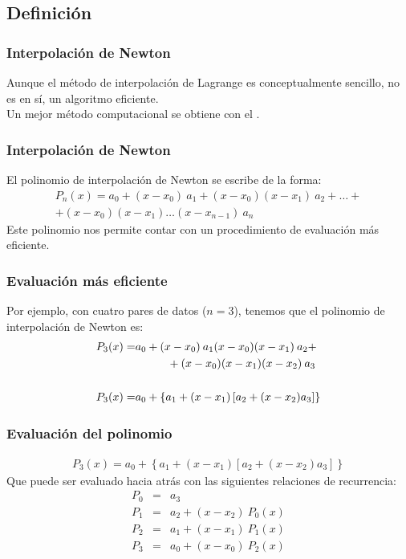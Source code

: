 \subsection{Definición}
\begin{frame}
\frametitle{Interpolación de Newton}
Aunque el método de interpolación de Lagrange es conceptualmente sencillo, no es en sí, un algoritmo eficiente.
\\
\medskip
Un mejor método computacional se obtiene con el .
\end{frame}
\begin{frame}
\frametitle{Interpolación de Newton}
El polinomio de interpolación de Newton se escribe de la forma:
\fontsize{12}{12}\selectfont
\[ \begin{split}
P_{n}(x) = a_{0} + (x - x_{0}) \: a_{1} + (x - x_{0})(x - x_{1}) \: a_{2} + \ldots + \\
+ (x - x_{0})(x - x_{1}) \ldots (x - x_{n - 1}) \: a_{n} 
\end{split} \]
\fontsize{14}{14}\selectfont
\pause
Este polinomio nos permite contar con un procedimiento de evaluación más eficiente.
\end{frame}
\begin{frame}
\frametitle{Evaluación más eficiente}
Por ejemplo, con cuatro pares de datos ($n = 3$), tenemos que el polinomio de interpolación de Newton es:
\begin{align*}
P_{3}(x) =& a_{0} + (x - x_{0}) \: a_{1} (x - x_{0})(x - x_{1}) \: a_{2} + \\		
{}& \hspace*{1cm} + (x - x_{0})(x - x_{1})(x - x_{2}) \: a_{3}  \\
\\
P_{3}(x) =& a_{0} + \left\lbrace a_{1}+(x-x_{1})\left[a_{2}+(x-x_{2})a_{3} \right] \right\rbrace 
\end{align*}
\end{frame}
\begin{frame}
\frametitle{Evaluación del polinomio}
\begin{align*}
P_{3}(x) = a_{0} + \left\lbrace a_{1}+(x-x_{1})\left[a_{2}+(x-x_{2})a_{3} \right] \right\rbrace 
\end{align*}
Que puede ser evaluado hacia atrás con las siguientes relaciones de recurrencia:
\begin{eqnarray*}
P_{0} &=& a_{3} \\
P_{1} &=& a_{2} + (x - x_{2}) \: P_{0}(x) \\
P_{2} &=& a_{1} + (x - x_{1}) \: P_{1}(x) \\
P_{3} &=& a_{0} + (x - x_{0}) \: P_{2}(x) 
\end{eqnarray*}
\end{frame}
